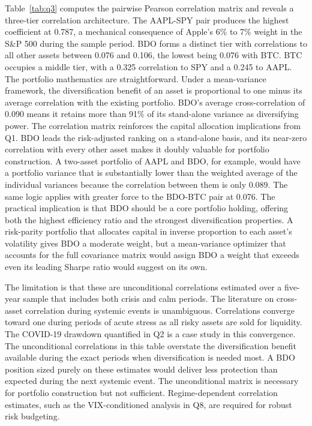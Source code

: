 Table~\ref{tab:q3} computes the pairwise Pearson correlation matrix and reveals a three-tier correlation architecture. The AAPL-SPY pair produces the highest coefficient at 0.787, a mechanical consequence of Apple's 6\% to 7\% weight in the S\&P 500 during the sample period. BDO forms a distinct tier with correlations to all other assets between 0.076 and 0.106, the lowest being 0.076 with BTC. BTC occupies a middle tier, with a 0.325 correlation to SPY and a 0.245 to AAPL. The portfolio mathematics are straightforward. Under a mean-variance framework, the diversification benefit of an asset is proportional to one minus its average correlation with the existing portfolio. BDO's average cross-correlation of 0.090 means it retains more than 91\% of its stand-alone variance as diversifying power.
The correlation matrix reinforces the capital allocation implications from Q1. BDO leads the risk-adjusted ranking on a stand-alone basis, and its near-zero correlation with every other asset makes it doubly valuable for portfolio construction. A two-asset portfolio of AAPL and BDO, for example, would have a portfolio variance that is substantially lower than the weighted average of the individual variances because the correlation between them is only 0.089. The same logic applies with greater force to the BDO-BTC pair at 0.076. The practical implication is that BDO should be a core portfolio holding, offering both the highest efficiency ratio and the strongest diversification properties. A risk-parity portfolio that allocates capital in inverse proportion to each asset's volatility gives BDO a moderate weight, but a mean-variance optimizer that accounts for the full covariance matrix would assign BDO a weight that exceeds even its leading Sharpe ratio would suggest on its own.

The limitation is that these are unconditional correlations estimated over a five-year sample that includes both crisis and calm periods. The literature on cross-asset correlation during systemic events is unambiguous. Correlations converge toward one during periods of acute stress as all risky assets are sold for liquidity. The COVID-19 drawdown quantified in Q2 is a case study in this convergence. The unconditional correlations in this table overstate the diversification benefit available during the exact periods when diversification is needed most. A BDO position sized purely on these estimates would deliver less protection than expected during the next systemic event. The unconditional matrix is necessary for portfolio construction but not sufficient. Regime-dependent correlation estimates, such as the VIX-conditioned analysis in Q8, are required for robust risk budgeting.

